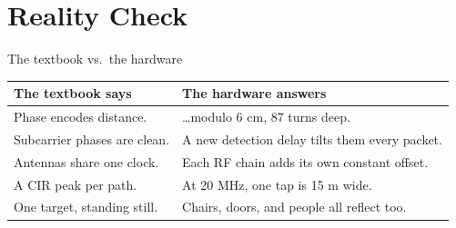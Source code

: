 
\section[Reality]{Reality Check}


\begin{frame}{The textbook vs.\ the hardware}
  \vspace{0.4em}
  \centering
  {\small\setlength{\tabcolsep}{5pt}
  \begin{tabular}{p{}p{}}
    \toprule
    \textbf{\textcolor{ranblue}{The textbook says}} &
    \textbf{\textcolor{talkred}{The hardware answers}} \\
    \midrule
    Phase encodes distance. &
    \ldots modulo 6 cm, 87 turns deep. \\[4pt]
    Subcarrier phases are clean. &
    A new detection delay tilts them every packet. \\[4pt]
    Antennas share one clock. &
    Each RF chain adds its own constant offset. \\[4pt]
    A CIR peak per path. &
    At 20 MHz, one tap is 15 m wide. \\[4pt]
    One target, standing still. &
    Chairs, doors, and people all reflect too. \\
    \bottomrule
  \end{tabular}\par}

  \vspace{0.7em}
\end{frame}

